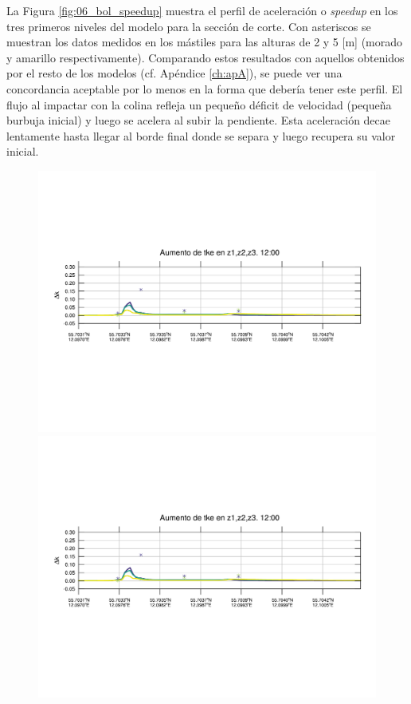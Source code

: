 La Figura \ref{fig:06_bol_speedup} muestra el perfil de aceleración o \emph{speedup} en los tres primeros niveles del modelo para la sección de corte. Con asteriscos se muestran los datos medidos en los mástiles para las alturas de 2 y 5 [m] (morado y amarillo respectivamente). Comparando estos resultados con aquellos obtenidos por el resto de los modelos (cf. Apéndice \ref{ch:apA}), se puede ver una concordancia aceptable por lo menos en la forma que debería tener este perfil. El flujo al impactar con la colina refleja un pequeño déficit de velocidad (pequeña burbuja inicial) y luego se acelera al subir la pendiente. Esta aceleración decae lentamente hasta llegar al borde final donde se separa y luego recupera su valor inicial. 

\begin{figure}[H]
	\centering
	\includegraphics[width=0.90\linewidth,trim={12mm 84mm 10mm 74mm},page=1,clip]{Imagenes/06/bol/delta_tke}\\%
	\includegraphics[width=0.90\linewidth,trim={12mm 84mm 10mm 74mm},page=13,clip]{Imagenes/06/bol/delta_tke}\\%

\end{figure}
